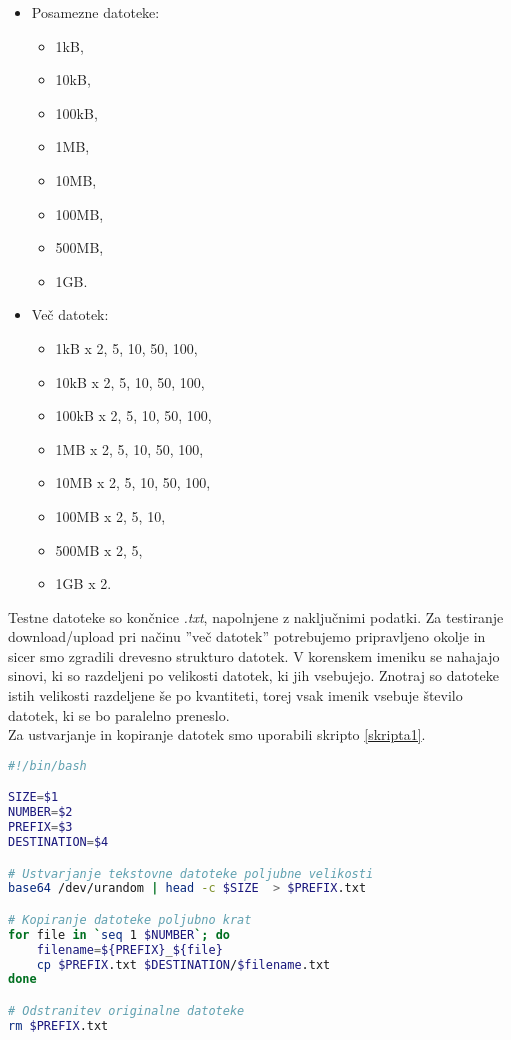 \documentclass[11pt]{article}
\begin{document}
\begin{multicols}{2}
\begin{itemize}
    \item Posamezne datoteke:
        \begin{itemize}
            \item 1kB,
            \item 10kB,
            \item 100kB,
            \item 1MB,
            \item 10MB,
            \item 100MB,
            \item 500MB,
            \item 1GB.
        \end{itemize}
    \item Več datotek:
        \begin{itemize}
            \item 1kB   x 2, 5, 10, 50, 100,
            \item 10kB  x 2, 5, 10, 50, 100,
            \item 100kB x 2, 5, 10, 50, 100,
            \item 1MB   x 2, 5, 10, 50, 100,
            \item 10MB  x 2, 5, 10, 50, 100,
            \item 100MB x 2, 5, 10,
            \item 500MB x 2, 5,
            \item 1GB   x 2.
        \end{itemize}
\end{itemize}
\end{multicols}

Testne datoteke so končnice \textit{.txt}, napolnjene z naključnimi podatki. Za testiranje download/upload pri načinu ''več datotek'' potrebujemo pripravljeno okolje in sicer smo zgradili drevesno strukturo datotek. V korenskem imeniku se nahajajo sinovi, ki so razdeljeni po velikosti datotek, ki jih vsebujejo. Znotraj so datoteke istih velikosti razdeljene še po kvantiteti, torej vsak imenik vsebuje število datotek, ki se bo paralelno preneslo. \\
Za ustvarjanje in kopiranje datotek smo uporabili skripto \ref{skripta1}. \\

\begin{lstlisting}[language=bash, captionpos=b, caption={Skripta za ustvarjanje in kopiranje datotek.}, label={skripta1}]
#!/bin/bash

SIZE=$1
NUMBER=$2
PREFIX=$3
DESTINATION=$4

# Ustvarjanje tekstovne datoteke poljubne velikosti
base64 /dev/urandom | head -c $SIZE  > $PREFIX.txt

# Kopiranje datoteke poljubno krat
for file in `seq 1 $NUMBER`; do
    filename=${PREFIX}_${file}
    cp $PREFIX.txt $DESTINATION/$filename.txt
done

# Odstranitev originalne datoteke
rm $PREFIX.txt
\end{lstlisting}
\end{document}
